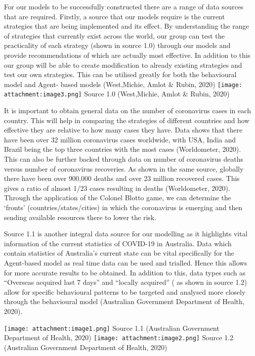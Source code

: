\documentclass[11pt]{article}
\begin{document}
    For our models to be successfully constructed there are a range of data
sources that are required. Firstly, a source that our models require is
the current strategies that are being implemented and its effect. By
understanding the range of strategies that currently exist across the
world, our group can test the practicality of each strategy (shown in
source 1.0) through our models and provide recommendations of which are
actually most effective. In addition to this our group will be able to
create modification to already existing strategies and test our own
strategies. This can be utilised greatly for both the behavioural model
and Agent- based models (West,Michie, Amlot \& Rubin, 2020)
\texttt{[image: attachment:image3.png]} Source 1.0 (West,Michie, Amlot
\& Rubin, 2020)

    It is important to obtain general data on the number of coronavirus
cases in each country. This will help in comparing the strategies of
different countries and how effective they are relative to how many
cases they have. Data shows that there have been over 32 million
coronavirus cases worldwide, with USA, India and Brazil being the top
three countries with the most cases (Worldometer, 2020). This can also
be further backed through data on number of coronavirus deaths versus
number of coronavirus recoveries. As shown in the same source, globally
there have been over 900,000 deaths and over 23 million recovered cases.
This gives a ratio of almost 1/23 cases resulting in deaths
(Worldometer, 2020). Through the application of the Colonel Blotto game,
we can determine the `fronts' (countries/states/cities) in which the
coronavirus is emerging and then sending available resources there to
lower the risk.

    Source 1.1 is another integral data source for our modelling as it
highlights vital information of the current statistics of COVID-19 in
Australia. Data which contain statistics of Australia's current state
can be vital specifically for the Agent-based model as real time data
can be used and trialled. Hence this allows for more accurate results to
be obtained. In addition to this, data types such as ``Overseas acquired
last 7 days'' and ``locally acquired'' ( as shown in source 1.2) allow
for specific behavioural patterns to be targeted and analysed more
closely through the behavioural model (Australian Government Department
of Health, 2020).

\texttt{[image: attachment:image1.png]} Source 1.1 (Australian
Government Department of Health, 2020)
\texttt{[image: attachment:image2.png]} Source 1.2 (Australian
Government Department of Health, 2020)
\end{document}
